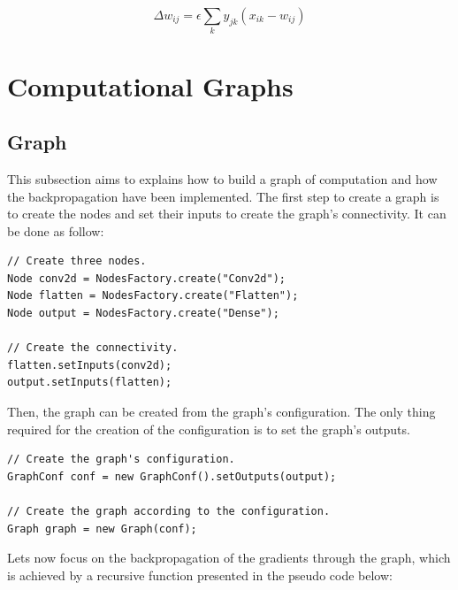 \documentclass[11pt]{report}
\begin{document}
\begin{equation}
\Delta w_{ij} = \epsilon \sum_{k} y_{jk}(x_{ik} - w_{ij})
\end{equation}

\section{Computational Graphs}

\subsection{Graph}

This subsection aims to explains how to build a graph of computation and how the backpropagation have been implemented. The first step to create a graph is to create the nodes and set their inputs to create the graph's connectivity. It can be done as follow:

\begin{verbatim}
// Create three nodes.
Node conv2d = NodesFactory.create("Conv2d");
Node flatten = NodesFactory.create("Flatten");
Node output = NodesFactory.create("Dense");

// Create the connectivity.
flatten.setInputs(conv2d);
output.setInputs(flatten);
\end{verbatim}

\noindent Then, the graph can be created from the graph's configuration. The only thing required for the creation of the configuration is to set the graph's outputs.

\begin{verbatim}
// Create the graph's configuration.
GraphConf conf = new GraphConf().setOutputs(output);

// Create the graph according to the configuration.
Graph graph = new Graph(conf);
\end{verbatim}

\noindent Lets now focus on the backpropagation of the gradients through the graph, which is achieved by a recursive function presented in the pseudo code below:
\end{document}
